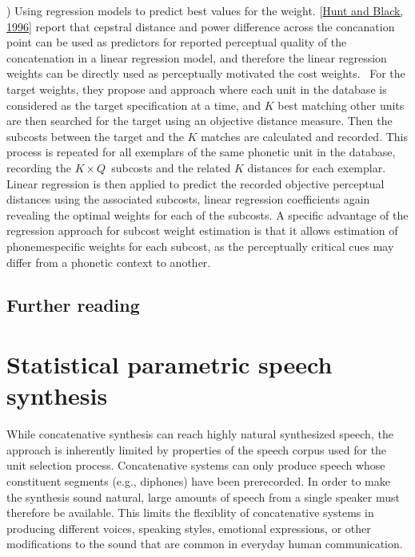 \documentclass[letterpaper,10pt,english]{jupyterBook}
\begin{document}
) Using regression models to predict best values for the weight. {[}\hyperlink{cite.Synthesis/Concatenative_speech_synthesis:id54}{Hunt and Black, 1996}{]} report that cepstral distance and power difference
across the concanation point can be used as predictors for reported
perceptual quality of the concatenation in a linear regression model,
and therefore the linear regression weights can be directly used as
perceptually motivated the cost weights.  For the target weights, they
propose and approach where each unit in the database is considered as
the target specification at a time, and \(K\) best matching other units
are then searched for the target using an objective distance measure.
Then the sub\sphinxhyphen{}costs between the target and the \(K\) matches are calculated
and recorded. This process is repeated for all exemplars of the same
phonetic unit in the database, recording the \(K\times Q\) subcosts and the
related \(K\) distances for each exemplar. Linear regression is then
applied to predict the recorded objective perceptual distances using the
associated sub\sphinxhyphen{}costs, linear regression coefficients again revealing the
optimal weights for each of the subcosts. A specific advantage of the
regression approach for subcost weight estimation is that it allows
estimation of phoneme\sphinxhyphen{}specific weights for each subcost, as the
perceptually critical cues may differ from a phonetic context to
another.


\subsection{Further reading}
\label{\detokenize{Synthesis/Concatenative_speech_synthesis:further-reading}}


\sphinxstepscope


\section{Statistical parametric speech synthesis}
\label{\detokenize{Synthesis/Statistical_parametric_speech_synthesis:statistical-parametric-speech-synthesis}}\label{\detokenize{Synthesis/Statistical_parametric_speech_synthesis::doc}}
\sphinxAtStartPar
While concatenative synthesis can reach highly natural synthesized
speech, the approach is inherently limited by properties of the speech
corpus used for the unit selection process. Concatenative systems can
only produce speech whose constituent segments (e.g., diphones) have
been pre\sphinxhyphen{}recorded. In order to make the synthesis sound natural, large
amounts of speech from a single speaker must therefore be available.
This limits the flexiblity of concatenative systems in producing
different voices, speaking styles, emotional expressions, or other
modifications to the sound that are common in everyday human
communication.
\end{document}
